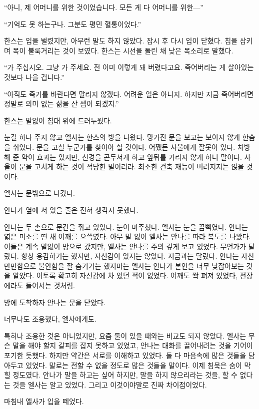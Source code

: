 ``아니, 제 어머니를 위한 것이었습니다. 모든 게 다 어머니를 위한—''

``기억도 못 하는구나. 그분도 평민 혈통이었다.''

한스는 입을 벌렸지만, 아무런 말도 하지 않았다. 잠시 후 다시 입이 닫혔다. 침을 삼키며 목이 불룩거리는 것이 보였다. 한스는 시선을 돌린 채 낮은 목소리로 말했다.

``가 주십시오. 그냥 가 주세요. 전 이미 이렇게 돼 버렸다고요. 죽어버리는 게 살아있는 것보다 나을 겁니다.''

``아직도 죽기를 바란다면 말리지 않겠다. 어려운 일은 아니지. 하지만 지금 죽어버리면 정말로 의미 없는 삶을 산 셈이 되겠지.''

한스는 말없이 침대 위에 드러누웠다.

눈길 하나 주지 않고 엘사는 한스의 방을 나왔다. 망가진 문을 보고는 보이지 않게 한숨을 쉬었다. 문을 고칠 누군가를 찾아야 할 것이다. 어쨌든 사울에게 잘못이 있다. 처방해 준 약이 효과는 있지만, 신경을 곤두서게 하고 앞뒤를 가리지 않게 하니 말이다. 사울이 문을 고치게 하는 것이 적당한 벌이리라. 최소한 건축 재능이 버려지지는 않을 것이다.

엘사는 문밖으로 나갔다.

안나가 옆에 서 있을 줄은 전혀 생각지 못했다.

안나는 두 손으로 문간을 쥐고 있었다. 눈이 마주쳤다. 엘사는 눈을 끔뻑였다. 안나는 엷은 미소를 띤 채 어깨를 으쓱였다. 아무 말 없이 엘사는 안나를 따라 복도를 나왔다. 이들은 계속 말없이 방으로 갔지만, 엘사는 안나를 주의 깊게 보고 있었다. 무언가가 달랐다. 항상 용감하기는 했지만, 자신감이 있지는 않았다. 지금과는 달랐다. 안나는 자신만만함으로 불안함을 잘 숨기기는 했지마는 엘사는 안나가 본인을 너무 낮잡아보는 것을 알았다. 이토록 확고히 자신감에 차 있던 적이 없었다. 어깨도 쫙 펴져 있었다, 전장에라도 들어서는 것처럼.

방에 도착하자 안나는 문을 닫았다.

\textbreak

너무나도 조용했다, 엘사에게도.

특히나 조용한 것은 아니었지만, 요즘 둘이 있을 때와는 비교도 되지 않았다. 엘사는 무슨 말을 해야 할지 갈피를 잡지 못하고 있었고, 안나는 대화를 끌어내려는 것을 기어이 포기한 듯했다. 하지만 약간은 서로를 이해하고 있었다. 둘 다 마음속에 많은 것들을 담아두고 있었다. 말로는 전할 수 없을 정도로 많은 것들을 말이다. 이제 침묵은 숨이 막힐 정도였다. 안나가 말을 하고는 싶어 하지만, 말을 하지 않으리라는 것을, 할 수 없다는 것을 엘사는 알고 있었다. 그리고 이것이야말로 진짜 차이점이었다.

마침내 엘사가 입을 떼었다.

